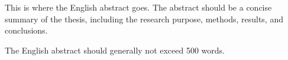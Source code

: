 

\begin{abstract}
  此处填写中文摘要内容。摘要是论文内容的高度概括，应具有独立性和自含性，即不阅读论文全文，就能获得必要的信息。摘要应包括研究目的、研究方法、研究结果和结论等主要内容。

  中文摘要一般不超过500字。

\end{abstract}

\begin{abstract*}
  This is where the English abstract goes. The abstract should be a concise summary of the thesis, including the research purpose, methods, results, and conclusions.

  The English abstract should generally not exceed 500 words.

\end{abstract*}
